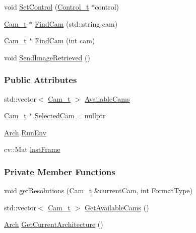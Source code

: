 \begin{DoxyCompactItemize}
\item 
void \hyperlink{class_hardware_1_1_microscope_a3b963a4b53aae0e215a20e9d59493e48}{Set\+Control} (\hyperlink{struct_hardware_1_1_microscope_1_1_control__t}{Control\+\_\+t} $\ast$control)
\item 
\hyperlink{struct_hardware_1_1_microscope_1_1_cam__t}{Cam\+\_\+t} $\ast$ \hyperlink{class_hardware_1_1_microscope_a64f57bcfcf93d75f7a27d0723487f35b}{Find\+Cam} (std\+::string cam)
\item 
\hyperlink{struct_hardware_1_1_microscope_1_1_cam__t}{Cam\+\_\+t} $\ast$ \hyperlink{class_hardware_1_1_microscope_a2050e5699079f24b73a91245441c63ca}{Find\+Cam} (int cam)
\item 
void \hyperlink{class_hardware_1_1_microscope_ada1437dd2c64a0dc6f8b9e92187108f9}{Send\+Image\+Retrieved} ()
\end{DoxyCompactItemize}
\subsubsection*{Public Attributes}
\begin{DoxyCompactItemize}
\item 
std\+::vector$<$ \hyperlink{struct_hardware_1_1_microscope_1_1_cam__t}{Cam\+\_\+t} $>$ \hyperlink{class_hardware_1_1_microscope_a49a52c74d900f217ed190d36b29ff27d}{Available\+Cams}
\item 
\hyperlink{struct_hardware_1_1_microscope_1_1_cam__t}{Cam\+\_\+t} $\ast$ \hyperlink{class_hardware_1_1_microscope_a059d62ec28e85f1c3f3225c9c78a877f}{Selected\+Cam} = nullptr
\item 
\hyperlink{class_hardware_1_1_microscope_ae1afa6a1a1d5b560a5ad8f94c78a336b}{Arch} \hyperlink{class_hardware_1_1_microscope_a544911a6d1eec986001087e5d9278604}{Run\+Env}
\item 
cv\+::\+Mat \hyperlink{class_hardware_1_1_microscope_afd9597ab8447b75fdf5e74783fdcf7b2}{last\+Frame}
\end{DoxyCompactItemize}
\subsubsection*{Private Member Functions}
\begin{DoxyCompactItemize}
\item 
void \hyperlink{class_hardware_1_1_microscope_ab4b24bd8062cafb1bfe47967ac66254e}{get\+Resolutions} (\hyperlink{struct_hardware_1_1_microscope_1_1_cam__t}{Cam\+\_\+t} \&current\+Cam, int Format\+Type)
\item 
std\+::vector$<$ \hyperlink{struct_hardware_1_1_microscope_1_1_cam__t}{Cam\+\_\+t} $>$ \hyperlink{class_hardware_1_1_microscope_a71a409aae67baf63fd27678eda462e38}{Get\+Available\+Cams} ()
\item 
\hyperlink{class_hardware_1_1_microscope_ae1afa6a1a1d5b560a5ad8f94c78a336b}{Arch} \hyperlink{class_hardware_1_1_microscope_a24538a26545c6138b2e922ed4feb9376}{Get\+Current\+Architecture} ()
\end{DoxyCompactItemize}
